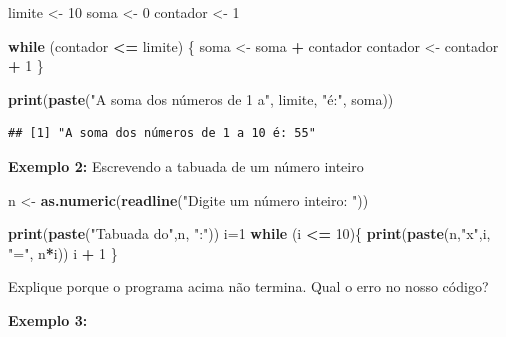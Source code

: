 \documentclass[
]{book}
\newenvironment{Shaded}{\begin{snugshade}}{\end{snugshade}}
\newcommand{\ControlFlowTok}[1]{\textcolor[rgb]{0.13,0.29,0.53}{\textbf{#1}}}
\newcommand{\DecValTok}[1]{\textcolor[rgb]{0.00,0.00,0.81}{#1}}
\newcommand{\FunctionTok}[1]{\textcolor[rgb]{0.13,0.29,0.53}{\textbf{#1}}}
\newcommand{\NormalTok}[1]{#1}
\newcommand{\OtherTok}[1]{\textcolor[rgb]{0.56,0.35,0.01}{#1}}
\newcommand{\SpecialCharTok}[1]{\textcolor[rgb]{0.81,0.36,0.00}{\textbf{#1}}}
\newcommand{\StringTok}[1]{\textcolor[rgb]{0.31,0.60,0.02}{#1}}
\begin{document}
\begin{Shaded}
\begin{Highlighting}[]
\NormalTok{limite }\OtherTok{\textless{}{-}} \DecValTok{10}
\NormalTok{soma }\OtherTok{\textless{}{-}} \DecValTok{0}
\NormalTok{contador }\OtherTok{\textless{}{-}} \DecValTok{1}

\ControlFlowTok{while}\NormalTok{ (contador }\SpecialCharTok{\textless{}=}\NormalTok{ limite) \{}
\NormalTok{  soma }\OtherTok{\textless{}{-}}\NormalTok{ soma }\SpecialCharTok{+}\NormalTok{ contador}
\NormalTok{  contador }\OtherTok{\textless{}{-}}\NormalTok{ contador }\SpecialCharTok{+} \DecValTok{1}
\NormalTok{\}}

\FunctionTok{print}\NormalTok{(}\FunctionTok{paste}\NormalTok{(}\StringTok{"A soma dos números de 1 a"}\NormalTok{, limite, }\StringTok{"é:"}\NormalTok{, soma))}
\end{Highlighting}
\end{Shaded}

\begin{verbatim}
## [1] "A soma dos números de 1 a 10 é: 55"
\end{verbatim}

\textbf{Exemplo 2:} Escrevendo a tabuada de um número inteiro

\begin{Shaded}
\begin{Highlighting}[]
\NormalTok{n }\OtherTok{\textless{}{-}} \FunctionTok{as.numeric}\NormalTok{(}\FunctionTok{readline}\NormalTok{(}\StringTok{"Digite um número inteiro: "}\NormalTok{))}

\FunctionTok{print}\NormalTok{(}\FunctionTok{paste}\NormalTok{(}\StringTok{"Tabuada do"}\NormalTok{,n, }\StringTok{":"}\NormalTok{))}
\NormalTok{i}\OtherTok{=}\DecValTok{1}
\ControlFlowTok{while}\NormalTok{ (i }\SpecialCharTok{\textless{}=} \DecValTok{10}\NormalTok{)\{  }
  \FunctionTok{print}\NormalTok{(}\FunctionTok{paste}\NormalTok{(n,}\StringTok{"x"}\NormalTok{,i, }\StringTok{"="}\NormalTok{, n}\SpecialCharTok{*}\NormalTok{i))  }
\NormalTok{  i }\SpecialCharTok{+} \DecValTok{1}
\NormalTok{\}}
\end{Highlighting}
\end{Shaded}

Explique porque o programa acima não termina. Qual o erro no nosso código?

\textbf{Exemplo 3:}
\end{document}
